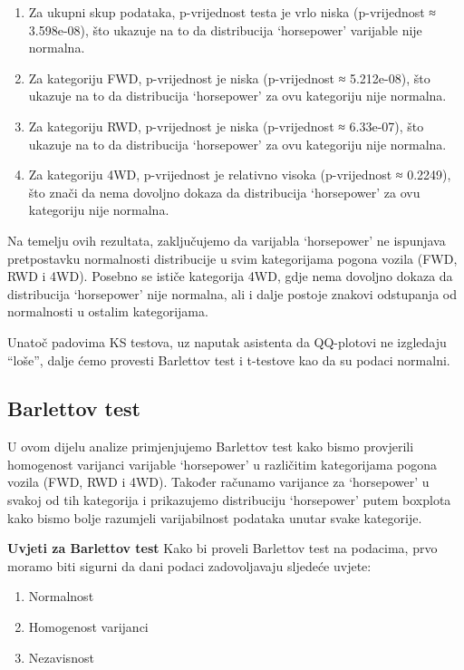 \documentclass[
]{article}
\providecommand{\tightlist}{%
  \setlength{\itemsep}{0pt}\setlength{\parskip}{0pt}}
\begin{document}
\begin{enumerate}
\def\labelenumi{\arabic{enumi}.}
\tightlist
\item
  Za ukupni skup podataka, p-vrijednost testa je vrlo niska
  (p-vrijednost ≈ 3.598e-08), što ukazuje na to da distribucija
  `horsepower' varijable nije normalna.
\item
  Za kategoriju FWD, p-vrijednost je niska (p-vrijednost ≈ 5.212e-08),
  što ukazuje na to da distribucija `horsepower' za ovu kategoriju nije
  normalna.
\item
  Za kategoriju RWD, p-vrijednost je niska (p-vrijednost ≈ 6.33e-07),
  što ukazuje na to da distribucija `horsepower' za ovu kategoriju nije
  normalna.
\item
  Za kategoriju 4WD, p-vrijednost je relativno visoka (p-vrijednost ≈
  0.2249), što znači da nema dovoljno dokaza da distribucija
  `horsepower' za ovu kategoriju nije normalna.
\end{enumerate}

Na temelju ovih rezultata, zaključujemo da varijabla `horsepower' ne
ispunjava pretpostavku normalnosti distribucije u svim kategorijama
pogona vozila (FWD, RWD i 4WD). Posebno se ističe kategorija 4WD, gdje
nema dovoljno dokaza da distribucija `horsepower' nije normalna, ali i
dalje postoje znakovi odstupanja od normalnosti u ostalim kategorijama.

Unatoč padovima KS testova, uz naputak asistenta da QQ-plotovi ne
izgledaju ``loše'', dalje ćemo provesti Barlettov test i t-testove kao
da su podaci normalni.

\subsection{Barlettov test}\label{barlettov-test}

U ovom dijelu analize primjenjujemo Barlettov test kako bismo provjerili
homogenost varijanci varijable `horsepower' u različitim kategorijama
pogona vozila (FWD, RWD i 4WD). Također računamo varijance za
`horsepower' u svakoj od tih kategorija i prikazujemo distribuciju
`horsepower' putem boxplota kako bismo bolje razumjeli varijabilnost
podataka unutar svake kategorije.

\textbf{Uvjeti za Barlettov test} Kako bi proveli Barlettov test na
podacima, prvo moramo biti sigurni da dani podaci zadovoljavaju sljedeće
uvjete:

\begin{enumerate}
\def\labelenumi{\arabic{enumi}.}
\tightlist
\item
  Normalnost
\item
  Homogenost varijanci
\item
  Nezavisnost
\end{enumerate}
\end{document}
